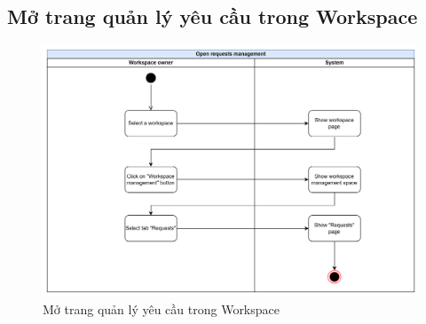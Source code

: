 \subsection{Mở trang quản lý yêu cầu trong Workspace}
    \begin{figure}[H]
        \centering
        \includegraphics[width=\linewidth]{Content/Phân tích và thiết kế hệ thống/documents/Sơ đồ hoạt động/images/openRequestsManagement.png}
        \vspace{0.5cm}
        \caption{Mở trang quản lý yêu cầu trong Workspace}
        \label{fig:Mở trang quản lý yêu cầu trong Workspace}
    \end{figure}